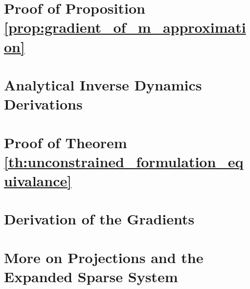 \section{Proof of Proposition \ref{prop:gradient_of_m_approximation}}
\label{app:gradient_of_m_approximation}


\section{Analytical Inverse Dynamics Derivations}
\label{app:analytical_inverse_dynamics_derivations}


\section{Proof of Theorem \ref{th:unconstrained_formulation_equivalance}}
\label{app:unconstrained_formulation_equivalance}


\section{Derivation of the Gradients}
\label{app:gradients_derivation}


\section{More on Projections and the Expanded Sparse System}
\label{app:more_on_projections}

